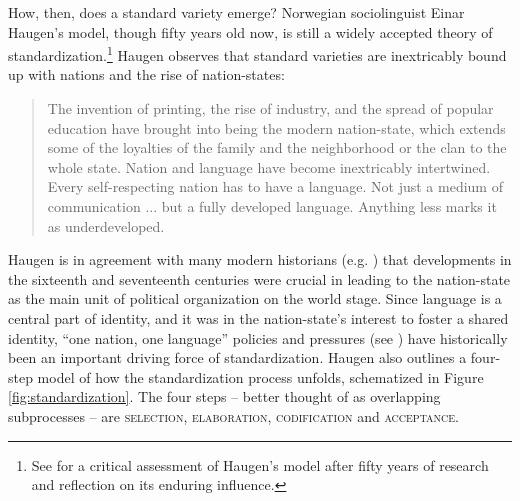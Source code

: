 How, then, does a standard variety emerge? Norwegian sociolinguist Einar Haugen's model, though fifty years old now, is still a widely accepted theory of standardization.\footnote{See \citet{JosephVostersRutten2020} for a critical assessment of Haugen's model after fifty years of research and reflection on its enduring influence.} Haugen observes that standard varieties are inextricably bound up with nations and the rise of nation-states:

\begin{quote}
The invention of printing, the rise of industry, and the spread of popular education have brought into being the modern nation-state, which extends some of the loyalties of the family and the neighborhood or the clan to the whole state. Nation and language have become inextricably intertwined. Every self-respecting nation has to have a language. Not just a medium of communication ... but a fully developed language. Anything less marks it as underdeveloped. \citeyearpar[927]{Haugen1966}
\end{quote}

\noindent Haugen is in agreement with many modern historians (e.g. \citealp{Foucault2007,Hobsbawm1990}) that developments in the sixteenth and seventeenth centuries were crucial in leading to the nation-state as the main unit of political organization on the world stage. Since language is a central part of identity, and it was in the nation-state's interest to foster a shared identity, ``one nation, one language'' policies and pressures (see \citealp{Piller2015}) have historically been an important driving force of standardization. Haugen also outlines a four-step model of how the standardization process unfolds, schematized in Figure \ref{fig:standardization}. The four steps -- better thought of as overlapping subprocesses -- are \textsc{selection}, \textsc{elaboration}, \textsc{codification} and \textsc{acceptance}.

